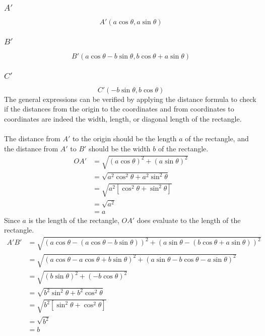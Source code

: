 \documentclass{article}
\begin{document}
        \subsubsection{$A'$}
        \begin{equation}
            A'(a\cos{\theta}, a\sin{\theta})
        \end{equation}
        \subsubsection{$B'$}
        \begin{equation}
            B'(a\cos{\theta} -b\sin{\theta}, b\cos{\theta} + a\sin{\theta})
        \end{equation}
        \subsubsection{$C'$}
        \begin{equation}
            C'(-b\sin{\theta}, b\cos{\theta})
        \end{equation}
        \newpage
        The general expressions can be verified by applying the distance formula to check if the distances from the origin to the coordinates and from coordinates to coordinates are indeed the width, length, or diagonal length of the rectangle.
        \\\\
        The distance from $A'$ to the origin should be the length $a$ of the rectangle, and the distance from $A'$ to $B'$ should be the width $b$ of the rectangle.
        \begin{align*}
	        OA' &= \sqrt{(a\cos\theta)^2 + (a\sin\theta)^2} \\
	        &= \sqrt{a^2\cos^2{\theta} + a^2\sin^2{\theta}} \\
	        &= \sqrt{a^2[\cos^2{\theta} + \sin^2{\theta}]} \\
	        &= \sqrt{a^2} \\
	        &= a
        \end{align*}
        Since $a$ is the length of the rectangle, $OA'$ does evaluate to the length of the rectangle.
        \begin{align*}
        	A'B'&= \sqrt{(a\cos{\theta} - (a\cos{\theta} -b\sin{\theta}))^2 + (a\sin{\theta} - (b\cos{\theta} + a\sin{\theta}))^2} \\
        	&= \sqrt{(a\cos{\theta} - a\cos{\theta} + b\sin{\theta})^2 + (a\sin{\theta} - b\cos{\theta} - a\sin{\theta})^2} \\
        	&= \sqrt{(b\sin{\theta})^2 + (- b\cos{\theta})^2} \\
        	&= \sqrt{b^2\sin^2{\theta} + b^2\cos^2{\theta}} \\
        	&= \sqrt{b^2[\sin^2{\theta} + \cos^2{\theta}]} \\
        	&= \sqrt{b^2} \\
        	&= b
        \end{align*}
\end{document}

